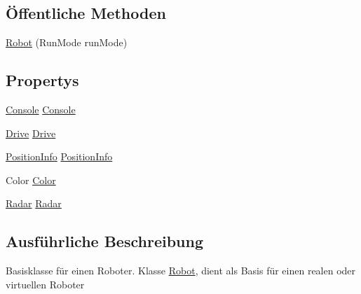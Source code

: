 \subsection*{Öffentliche Methoden}
\begin{DoxyCompactItemize}
\item 
\hyperlink{class_robot_ctrl_1_1_robot_acdd921df41328916b058eaad84ed3078}{Robot} (RunMode runMode)
\end{DoxyCompactItemize}
\subsection*{Propertys}
\begin{DoxyCompactItemize}
\item 
\hyperlink{class_robot_ctrl_1_1_console}{Console} \hyperlink{class_robot_ctrl_1_1_robot_ae78d1691cc943383977741712962bf82}{Console}
\item 
\hyperlink{class_robot_ctrl_1_1_drive}{Drive} \hyperlink{class_robot_ctrl_1_1_robot_a6e1e59f43f8578d78da6c6a19e55f269}{Drive}
\item 
\hyperlink{struct_robot_ctrl_1_1_position_info}{PositionInfo} \hyperlink{class_robot_ctrl_1_1_robot_abf06b5671ccaf469cc251723ec811002}{PositionInfo}
\item 
Color \hyperlink{class_robot_ctrl_1_1_robot_a894338ff794429cdf09647ff8d73d83e}{Color}
\item 
\hyperlink{class_robot_ctrl_1_1_radar}{Radar} \hyperlink{class_robot_ctrl_1_1_robot_adcc563b2531e72dcdfb9af5cafda1cbc}{Radar}
\end{DoxyCompactItemize}


\subsection{Ausführliche Beschreibung}
Basisklasse f\"{u}r einen Roboter. Klasse \hyperlink{class_robot_ctrl_1_1_robot}{Robot}, dient als Basis f\"{u}r einen realen oder virtuellen Roboter 

